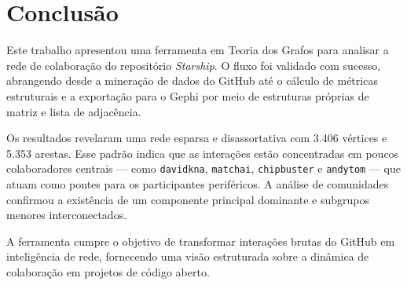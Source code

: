 \documentclass[12pt]{article}
\begin{document}
\section{Conclusão}

Este trabalho apresentou uma ferramenta em Teoria dos Grafos para analisar a rede de colaboração do repositório \textit{Starship}. O fluxo foi validado com sucesso, abrangendo desde a mineração de dados do GitHub até o cálculo de métricas estruturais e a exportação para o Gephi por meio de estruturas próprias de matriz e lista de adjacência.

Os resultados revelaram uma rede esparsa e disassortativa com 3.406 vértices e 5.353 arestas. Esse padrão indica que as interações estão concentradas em poucos colaboradores centrais --- como \texttt{davidkna}, \texttt{matchai}, \texttt{chipbuster} e \texttt{andytom} --- que atuam como pontes para os participantes periféricos. A análise de comunidades confirmou a existência de um componente principal dominante e subgrupos menores interconectados.

A ferramenta cumpre o objetivo de transformar interações brutas do GitHub em inteligência de rede, fornecendo uma visão estruturada sobre a dinâmica de colaboração em projetos de código aberto.

\vspace{10pt}
\begingroup
\renewcommand{\clearpage}{}


\endgroup
\end{document}
